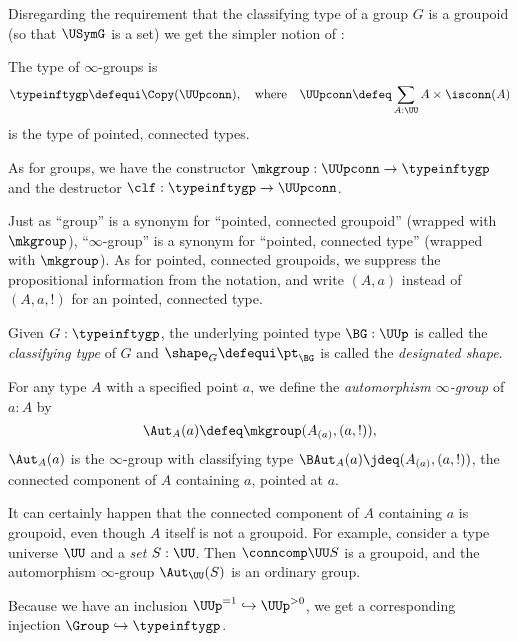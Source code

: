 Disregarding the requirement that the classifying type
of a group $G$ is a groupoid (so that $\USymG$ is a set)
we get the simpler notion of \inftygps:
\begin{definition}\label{def:inftygps}
  The type of $\infty$-groups is
  \[
    \typeinftygp\defequi \Copy(\UUpconn),
    \quad\text{where}\quad
    \UUpconn\defeq \sum_{A:\UU} A\times \isconn(A)
  \]
  is the type of pointed, connected types.

  As for groups, we have the constructor 
  $\mkgroup : \UUpconn \to \typeinftygp$
  and the destructor $\clf : \typeinftygp \to \UUpconn$.
\end{definition}

\begin{remark}\label{rem:pointedtypes}
  Just as ``group'' is a synonym for ``pointed, connected groupoid''
  (wrapped with $\mkgroup$),
  ``$\infty$-group'' is a synonym for ``pointed, connected type''
  (wrapped with $\mkgroup$).
  As for pointed, connected groupoids,
  we suppress the propositional information from the notation,
  and write $(A,a)$ instead of $(A,a,!)$ for an pointed, connected type.
\end{remark}

\begin{definition}\label{def:classifyingspace}
  Given $G:\typeinftygp$,
  the underlying pointed type $\BG : \UUp$
  is called the  \emph{classifying type} of $G$ and $\shape_G\defequi \pt_{\BG}$
  is called the \emph{designated shape}.
\end{definition}

\begin{definition}
  For any type $A$ with a specified point $a$,
  we define the \emph{automorphism $\infty$-group} of $a:A$ by
  \[
    \Aut_A(a) \defeq \mkgroup (A_{(a)},(a,!)),
  \]
  \ie $\Aut_A(a)$ is the $\infty$-group with classifying type
  $\BAut_A(a) \jdeq (A_{(a)},(a,!))$,
  the connected component of $A$ containing $a$, pointed at $a$.
\end{definition}

\begin{remark}\label{rem:autinfgp}
  It can certainly happen that the connected component of $A$ containing $a$
  is groupoid, even though $A$ itself is not a groupoid.
  For example, consider a type universe $\UU$ and a \emph{set} $S:\UU$.
  Then $\conncomp\UU S$ is a groupoid, and the automorphism $\infty$-group
  $\Aut_\UU(S)$ is an ordinary group.

  Because we have an inclusion $\UUp^{=1} \hookrightarrow \UUp^{>0}$,
  we get a corresponding injection $\Group \hookrightarrow \typeinftygp$.
\end{remark}

